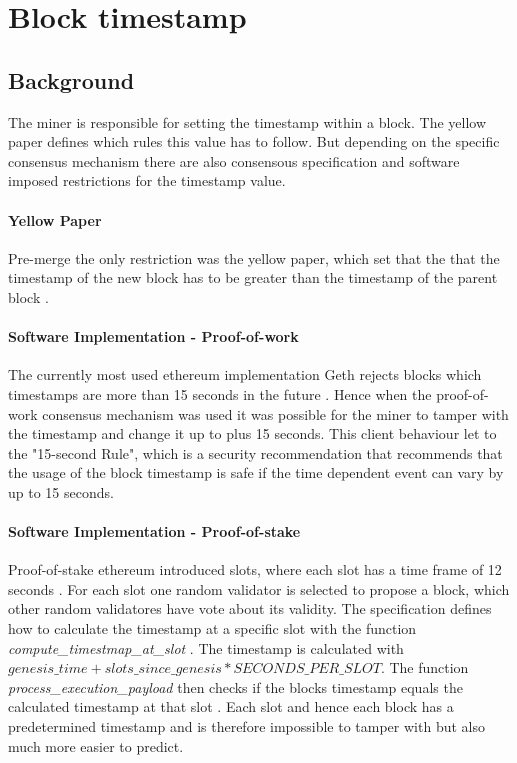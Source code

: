 \section{Block timestamp}

\subsection{Background} 
The miner is responsible for setting the timestamp within a block. The yellow
paper defines which rules this value has to follow. But depending on the
specific consensus mechanism there are also consensous specification and
software imposed restrictions for the timestamp value. 

\paragraph{Yellow Paper}
Pre-merge the only restriction was the yellow paper, which set that the that
the timestamp of the new block has to be greater than the timestamp of the
parent block \cite{ethyellowpaper2023}.

\paragraph{Software Implementation - Proof-of-work}
The currently most used ethereum implementation Geth rejects blocks which
timestamps are more than 15 seconds in the future
\cite{go-ethereum-15-sek-limit}. Hence when the proof-of-work consensus
mechanism was used it was possible for the miner to tamper with the timestamp
and change it up to plus 15 seconds. This client behaviour let to the
"15-second Rule", which is a security recommendation that recommends that the
usage of the block timestamp is safe if the time dependent event can vary by up
to 15 seconds.

\paragraph{Software Implementation - Proof-of-stake}
Proof-of-stake ethereum introduced slots, where each slot has a time frame of
12 seconds \cite{seconds-per-slot-mainnet}\cite{seconds-per-slot-mainnet-doc}.
For each slot one random validator is selected to propose a block, which other
random validatores have vote about its validity. The specification defines
how to calculate the timestamp at a specific slot with the function
\textit{compute\_timestmap\_at\_slot} \cite{compute-timestamp-at-slot}. The
timestamp is calculated with $genesis\_time + slots\_since\_genesis *
SECONDS\_PER\_SLOT$. The function \textit{process\_execution\_payload} then
checks if the blocks timestamp equals the calculated timestamp at that slot
\cite{process-execution-payload}. Each slot and hence each block has
a predetermined timestamp and is therefore impossible to tamper with but
also much more easier to predict.

